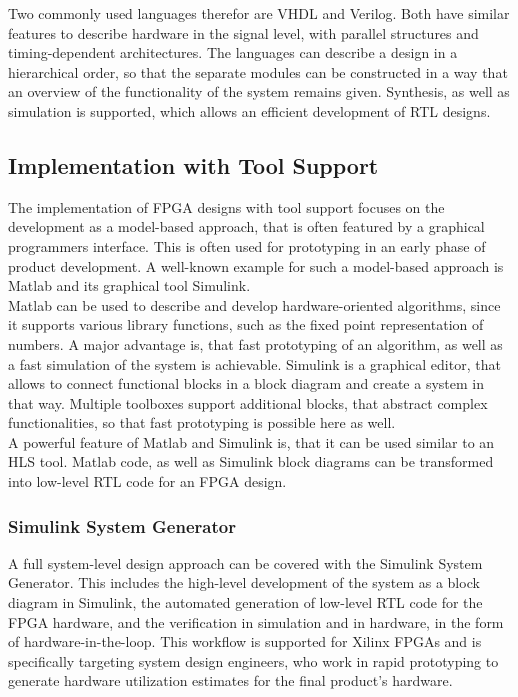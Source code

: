 Two commonly used languages therefor are VHDL and Verilog.
Both have similar features to describe hardware in the signal level, with parallel structures and timing-dependent architectures.
The languages can describe a design in a hierarchical order, so that the separate modules can be constructed in a way that an overview of the functionality of the system remains given.
Synthesis, as well as simulation is supported, which allows an efficient development of RTL designs.

\subsection{Implementation with Tool Support}

The implementation of FPGA designs with tool support focuses on the development as a model-based approach, that is often featured by a graphical programmers interface.
This is often used for prototyping in an early phase of product development.
A well-known example for such a model-based approach is Matlab and its graphical tool Simulink.\\

Matlab can be used to describe and develop hardware-oriented algorithms, since it supports various library functions, such as the fixed point representation of numbers.
A major advantage is, that fast prototyping of an algorithm, as well as a fast simulation of the system is achievable.
Simulink is a graphical editor, that allows to connect functional blocks in a block diagram and create a system in that way.
Multiple toolboxes support additional blocks, that abstract complex functionalities, so that fast prototyping is possible here as well.\\

A powerful feature of Matlab and Simulink is, that it can be used similar to an HLS tool.
Matlab code, as well as Simulink block diagrams can be transformed into low-level RTL code for an FPGA design.

\subsubsection{Simulink System Generator}

A full system-level design approach can be covered with the Simulink System Generator.
This includes the high-level development of the system as a block diagram in Simulink, the automated generation of low-level RTL code for the FPGA hardware, and the verification in simulation and in hardware, in the form of hardware-in-the-loop.
This workflow is supported for Xilinx FPGAs and is specifically targeting system design engineers, who work in rapid prototyping to generate hardware utilization estimates for the final product's hardware.\\

